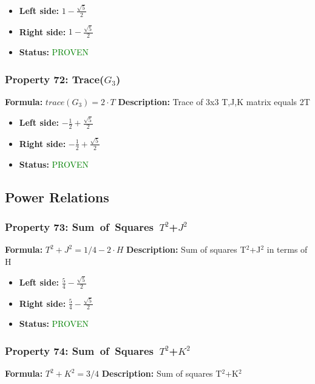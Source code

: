 \begin{itemize}
\item \textbf{Left side:} $1 - \frac{\sqrt{5}}{2}$
\item \textbf{Right side:} $1 - \frac{\sqrt{5}}{2}$
\item \textbf{Status:} \textcolor{green}{PROVEN}
\end{itemize}

\subsubsection*{Property 72: Trace($G_{3}$)}
\textbf{Formula:} $trace(G_3) = 2 \cdot T$
\textbf{Description:} Trace of 3x3 T,J,K matrix equals 2T

\begin{itemize}
\item \textbf{Left side:} $- \frac{1}{2} + \frac{\sqrt{5}}{2}$
\item \textbf{Right side:} $- \frac{1}{2} + \frac{\sqrt{5}}{2}$
\item \textbf{Status:} \textcolor{green}{PROVEN}
\end{itemize}


\subsection{Power Relations}

\subsubsection*{Property 73: Sum~of~Squares~$T^{2}$+$J^{2}$}
\textbf{Formula:} $T^2 + J^2 = 1/4 - 2 \cdot H$
\textbf{Description:} Sum of squares T$^2$+J$^2$ in terms of H

\begin{itemize}
\item \textbf{Left side:} $\frac{5}{4} - \frac{\sqrt{5}}{2}$
\item \textbf{Right side:} $\frac{5}{4} - \frac{\sqrt{5}}{2}$
\item \textbf{Status:} \textcolor{green}{PROVEN}
\end{itemize}

\subsubsection*{Property 74: Sum~of~Squares~$T^{2}$+$K^{2}$}
\textbf{Formula:} $T^2 + K^2 = 3/4$
\textbf{Description:} Sum of squares T$^2$+K$^2$

